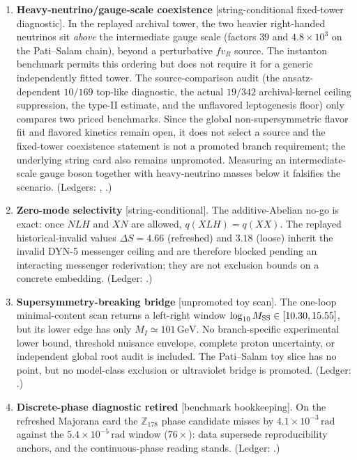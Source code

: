 \documentclass[
  aps,
  prd,
  preprint,
  nofootinbib,
  superscriptaddress,
  longbibliography
]{revtex4-2}
\begin{document}
\begin{enumerate}
\item[K8.] \textbf{Heavy-neutrino/gauge-scale coexistence}
[string-conditional fixed-tower diagnostic].  In the replayed archival
tower, the two heavier right-handed neutrinos sit \emph{above} the
intermediate gauge scale (factors \(39\) and \(4.8\times10^{3}\) on the
Pati--Salam chain), beyond a perturbative \(f v_R\) source.  The instanton
benchmark permits this ordering but does not require it for a generic
independently fitted tower.  The source-comparison audit
(the ansatz-dependent \(10/169\) top-like diagnostic, the actual
\(19/342\) archival-kernel ceiling suppression, the type-II estimate,
and the unflavored leptogenesis floor) only compares two priced benchmarks.
Since the global
non-supersymmetric flavor fit and flavored kinetics remain open, it does not
select a source and the fixed-tower coexistence statement is not a promoted
branch requirement;
the underlying string card also remains unpromoted.  Measuring an
intermediate-scale gauge boson together with heavy-neutrino masses
below it falsifies the scenario.
(Ledgers: ,
.)

\item[K9.] \textbf{Zero-mode selectivity} [string-conditional].
The additive-Abelian no-go is exact: once \(NLH\) and \(XN\) are allowed,
\(q(XLH)=q(XX)\).  The replayed historical-invalid values
\(\Delta S=4.66\) (refreshed) and \(3.18\) (loose) inherit the invalid
DYN-5 messenger ceiling and are therefore
blocked pending an interacting messenger rederivation; they are not exclusion
bounds on a concrete embedding.
(Ledger: .)

\item[K10.] \textbf{Supersymmetry-breaking bridge} [unpromoted toy scan].
The one-loop minimal-content scan returns a left-right window
\(\log_{10}M_{\rm SS}\in[10.30,15.55]\), but its lower edge has only
\(M_I\simeq101\,\mathrm{GeV}\).  No branch-specific experimental lower bound,
threshold nuisance envelope, complete proton uncertainty, or independent
global root audit is included.  The Pati--Salam toy slice has no point, but no
model-class exclusion or ultraviolet bridge is promoted.
(Ledger: .)

\item[K11.] \textbf{Discrete-phase diagnostic retired} [benchmark
bookkeeping].  On the refreshed Majorana card the
\(\mathbb Z_{178}\) phase candidate misses by
\(4.1\times10^{-3}\,\mathrm{rad}\) against the
\(5.4\times10^{-5}\,\mathrm{rad}\) window (\(76\times\)): data
supersede reproducibility anchors, and the continuous-phase reading
stands.  (Ledger: .)
\end{enumerate}
\end{document}
